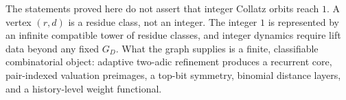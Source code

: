 \documentclass[11pt]{article}
\theoremstyle{definition}
\theoremstyle{remark}
\begin{document}
The statements proved here do not assert that integer Collatz orbits reach $1$.  A vertex $(r,d)$ is a residue class, not an integer.  The integer $1$ is represented by an infinite compatible tower of residue classes, and integer dynamics require lift data beyond any fixed $G_D$.  What the graph supplies is a finite, classifiable combinatorial object: adaptive two-adic refinement produces a recurrent core, pair-indexed valuation preimages, a top-bit symmetry, binomial distance layers, and a history-level weight functional.
\end{document}
